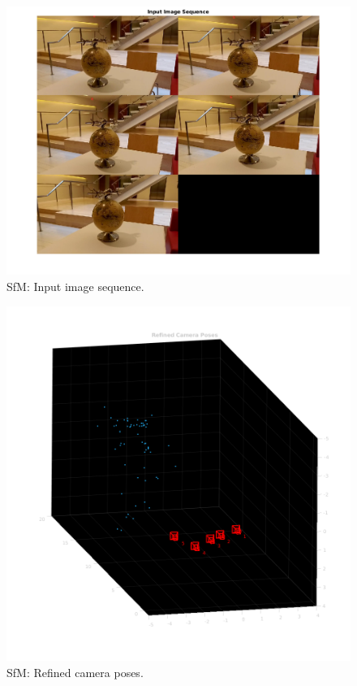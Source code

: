 \documentclass[11pt]{article}
\begin{document}
\begin{itemize}
    \begin{figure}[H]
      \begin{center}
        \includegraphics[width=.6\linewidth]{input_img_sequence.png}
      \end{center}
      \caption{SfM: Input image sequence.}
    \end{figure}

    \begin{figure}[H]
      \begin{center}
        \includegraphics[width=.6\linewidth]{refined_cam_poses.png}
      \end{center}
      \caption{SfM: Refined camera poses.}
    \end{figure}


\end{itemize}
\end{document}
